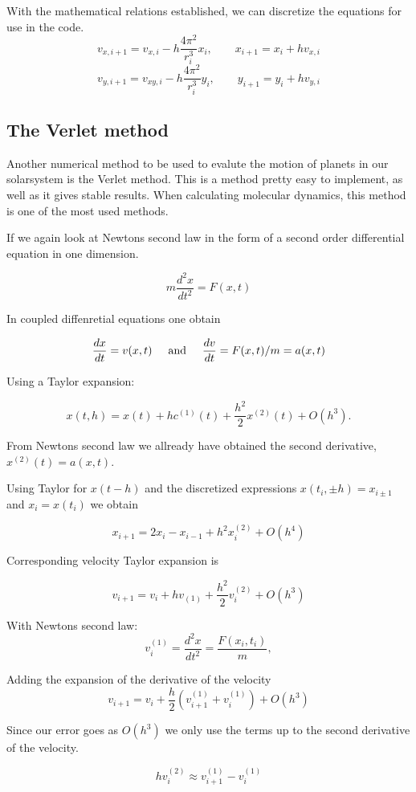 \documentclass[../main.tex]{subfiles}
\begin{document}
With the mathematical relations established, we can discretize the equations for use in the code.
$$v_{x,i+1} = v_{x,i} - h \frac{4\pi^2}{r_i^3}x_i,\qquad x_{i+1} = x_{i} + hv_{x,i}$$
$$v_{y,i+1} = v_{xy,i} - h \frac{4\pi^2}{r_i^3}y_i,\qquad y_{i+1} = y_{i} + hv_{y,i}$$

\subsection{The Verlet method}
Another numerical method to be used to evalute the motion of planets in our solarsystem is the Verlet method. This is a method pretty easy to implement, as well as it gives stable results. When calculating molecular dynamics, this method is one of the most used methods.

If we again look at Newtons second law in the form of a second order differential equation in one dimension.


 $$m \frac{d^2x}{dt^2} = F(x,t)$$


In coupled diffenretial equations one obtain

\[\frac{dx}{dt} = v(x,t)\hspace{5mm} \textrm{and} \hspace{5mm} \frac{dv}{dt} = F(x,t)/m = a(x,t)\]

Using a Taylor expansion:

 $$x(t,h) = x(t) + hc^{(1)}(t) + \frac{h^2}{2}x^{(2)}(t) + O(h^3).$$


From Newtons second law we allready have obtained the second derivative, $x^{(2)}(t) = a(x,t)$.

Using Taylor for $x(t-h)$ and the discretized expressions $x(t_i,\pm h) = x_{i \pm 1}$ and $x_i = x(t_i)$ we obtain

$$x_{i+1} = 2x_i - x_{i-1} + h^2 x_i^{(2)} + O(h^4)$$

Corresponding velocity Taylor expansion is

$$v_{i+1} = v_i + hv_{(1)} + \frac{h^2}{2} v_i^{(2)} + O(h^3)$$

With Newtons second law:
$$v_i^{(1)} = \frac{d^2x}{dt^2} = \frac{F(x_i, t_i)}{m},$$

Adding the expansion of the derivative of the velocity
$$v_{i+1} = v_i + \frac{h}{2}\left(v_{i+1}^{(1)} + v_i^{(1)}\right) + O(h^3)$$

Since our error goes as $O(h^3)$ we only use the terms up to the second derivative of the velocity.

$$hv_i^{(2)}\approx v_{i+1}^{(1)} - v_i^{(1)}$$
\end{document}
